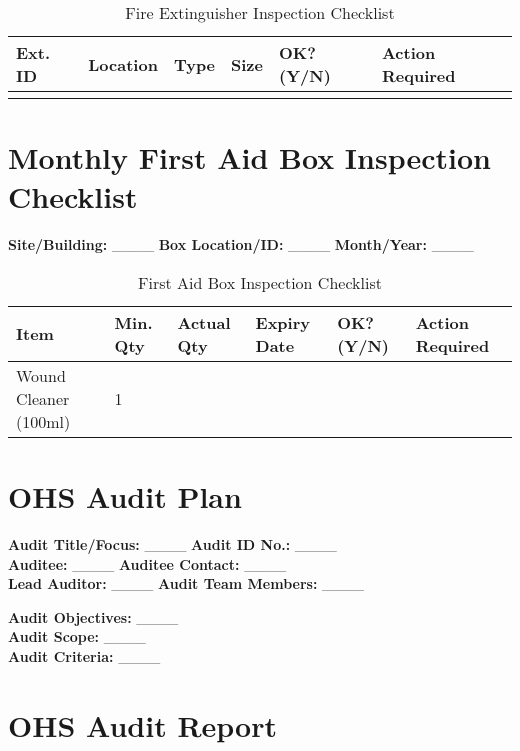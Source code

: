 \documentclass[12pt]{article}
\begin{document}
\begin{table}[h]
    \centering
    \begin{tabular}{p{2cm}p{3cm}p{3cm}p{2cm}p{3cm}p{3cm}}
        \toprule
        \textbf{Ext. ID} & \textbf{Location} & \textbf{Type} & \textbf{Size} & \textbf{OK? (Y/N)} & \textbf{Action Required} \\
        \midrule
        & & & & & \\
        \bottomrule
    \end{tabular}
    \caption{Fire Extinguisher Inspection Checklist}
\end{table}

\section{Monthly First Aid Box Inspection Checklist}

\textbf{Site/Building:} \_\_\_\_ \textbf{Box Location/ID:} \_\_\_\_ \textbf{Month/Year:} \_\_\_\_

\begin{table}[h]
    \centering
    \begin{tabular}{p{3cm}p{2cm}p{2cm}p{2cm}p{2cm}p{3cm}}
        \toprule
        \textbf{Item} & \textbf{Min. Qty} & \textbf{Actual Qty} & \textbf{Expiry Date} & \textbf{OK? (Y/N)} & \textbf{Action Required} \\
        \midrule
        Wound Cleaner (100ml) & 1 & & & & \\
        \bottomrule
    \end{tabular}
    \caption{First Aid Box Inspection Checklist}
\end{table}

\section{OHS Audit Plan}

\textbf{Audit Title/Focus:} \_\_\_\_ \textbf{Audit ID No.:} \_\_\_\_\\
\textbf{Auditee:} \_\_\_\_ \textbf{Auditee Contact:} \_\_\_\_\\
\textbf{Lead Auditor:} \_\_\_\_ \textbf{Audit Team Members:} \_\_\_\_

\textbf{Audit Objectives:} \_\_\_\_\\
\textbf{Audit Scope:} \_\_\_\_\\
\textbf{Audit Criteria:} \_\_\_\_

\section{OHS Audit Report}
\end{document}
